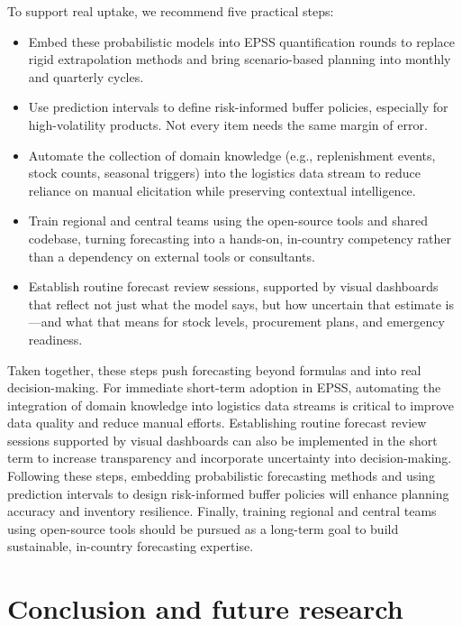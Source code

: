 \documentclass[
  authoryear,
  preprint,
  3p]{elsarticle}
\begin{document}
To support real uptake, we recommend five practical steps:

\begin{itemize}
\item
  Embed these probabilistic models into EPSS quantification rounds to
  replace rigid extrapolation methods and bring scenario-based planning
  into monthly and quarterly cycles.
\item
  Use prediction intervals to define risk-informed buffer policies,
  especially for high-volatility products. Not every item needs the same
  margin of error.
\item
  Automate the collection of domain knowledge (e.g., replenishment
  events, stock counts, seasonal triggers) into the logistics data
  stream to reduce reliance on manual elicitation while preserving
  contextual intelligence.
\item
  Train regional and central teams using the open-source tools and
  shared codebase, turning forecasting into a hands-on, in-country
  competency rather than a dependency on external tools or consultants.
\item
  Establish routine forecast review sessions, supported by visual
  dashboards that reflect not just what the model says, but how
  uncertain that estimate is---and what that means for stock levels,
  procurement plans, and emergency readiness.
\end{itemize}

Taken together, these steps push forecasting beyond formulas and into
real decision-making. For immediate short-term adoption in EPSS,
automating the integration of domain knowledge into logistics data
streams is critical to improve data quality and reduce manual efforts.
Establishing routine forecast review sessions supported by visual
dashboards can also be implemented in the short term to increase
transparency and incorporate uncertainty into decision-making. Following
these steps, embedding probabilistic forecasting methods and using
prediction intervals to design risk-informed buffer policies will
enhance planning accuracy and inventory resilience. Finally, training
regional and central teams using open-source tools should be pursued as
a long-term goal to build sustainable, in-country forecasting expertise.

\section{Conclusion and future research}\label{sec-conclusion}
\end{document}
